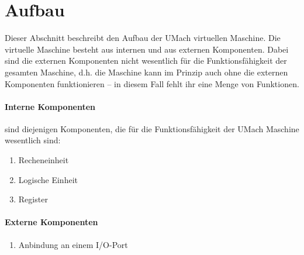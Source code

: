 \section{Aufbau}
\label{sec:Aufbau}
Dieser Abschnitt beschreibt den Aufbau der UMach virtuellen Maschine.
Die virtuelle Maschine besteht aus internen und aus externen Komponenten. Dabei
sind die externen Komponenten nicht wesentlich für die Funktionsfähigkeit der
gesamten Maschine, d.h. die Maschine kann im Prinzip auch ohne die externen
Komponenten funktionieren -- in diesem Fall fehlt ihr eine Menge von Funktionen.

\paragraph{Interne Komponenten}
sind diejenigen Komponenten, die für die Funktionsfähigkeit der UMach
Maschine wesentlich sind:
\begin{enumerate}
  \item Recheneinheit
  \item Logische Einheit
  \item Register
\end{enumerate}


\paragraph{Externe Komponenten}

\begin{enumerate}
  \item Anbindung an einem I/O-Port
\end{enumerate}

